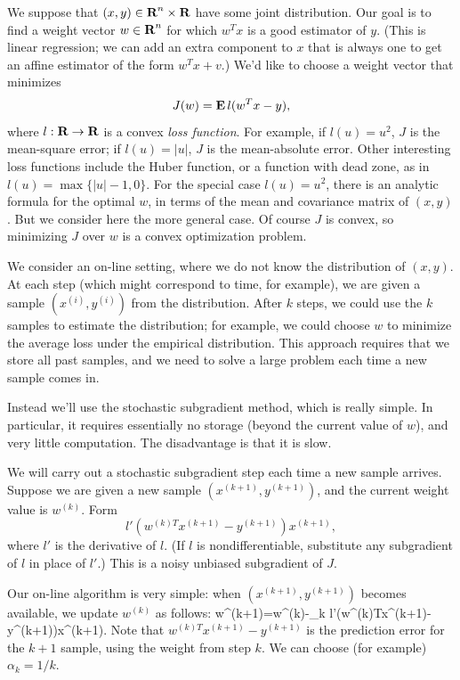 \documentclass[12pt]{article}
\begin{document}
We suppose that $(x,y) \in {\mbox{\bf R}}^n \times {\mbox{\bf R}}$ have
some joint distribution.  Our goal is to find a weight vector $w \in
{\mbox{\bf R}}^n$ for which $w^Tx$ is a good estimator of $y$.
(This is linear regression; we can
add an extra component to $x$ that is always one to get an
affine estimator of the form $w^Tx+v$.)
We'd like to choose a weight vector that minimizes
\[
J(w) = \mathop{\bf E{}} l(w^Tx-y),
\]
where $l:{\mbox{\bf R}} \rightarrow {\mbox{\bf R}}$ is a convex \emph{loss function}.
For example, if $l(u)=u^2$, $J$ is the mean-square error;
if $l(u)=|u|$, $J$ is the mean-absolute error.
Other interesting loss functions include the Huber function,
or a function with dead zone, as in $l(u)=\max\{|u|-1,0\}$.
For the special case $l(u)=u^2$, there is an analytic formula for
the optimal $w$, in terms of the mean and covariance matrix of
$(x,y)$.  But we consider here the more general case.
Of course $J$ is convex, so minimizing $J$ over $w$ is a
convex optimization problem.

We consider an on-line setting, where we do not know the distribution
of $(x,y)$.  At each step (which might correspond to time, for example),
we are given a sample $(x^{(i)},y^{(i)})$ from the distribution.
After $k$ steps, we could use the $k$ samples to estimate the
distribution; for example, we could choose $w$ to minimize
the average loss under the empirical distribution.
This approach requires that we store all past samples, and we need to
solve a large problem each time a new sample comes in.

Instead we'll use the stochastic subgradient method, which is really
simple.  In particular, it requires essentially no storage (beyond the
current value of $w$), and very little computation.
The disadvantage is that it is slow.

We will carry out a stochastic subgradient step each time a new
sample arrives.
Suppose we are given a new sample $(x^{(k+1)},y^{(k+1)})$,
and the current weight value is $w^{(k)}$.
Form
\[
l'(w^{(k)T}x^{(k+1)}-y^{(k+1)})x^{(k+1)},
\]
where $l'$ is the derivative of $l$.  (If $l$ is nondifferentiable,
substitute any subgradient of $l$ in place of $l'$.)
This is a noisy unbiased subgradient of $J$.

Our on-line algorithm is very simple: when $(x^{(k+1)},y^{(k+1)})$
becomes available, we update $w^{(k)}$ as follows:
\BEQ\label{e-online-update}
w^{(k+1)}=w^{(k)}-\alpha_k
l'(w^{(k)T}x^{(k+1)}-y^{(k+1)})x^{(k+1)}.
\EEQ
Note that $w^{(k)T}x^{(k+1)}-y^{(k+1)}$ is the
prediction error for the $k+1$ sample, using the weight from
step $k$.
We can choose (for example) $\alpha_k=1/k$.
\end{document}
